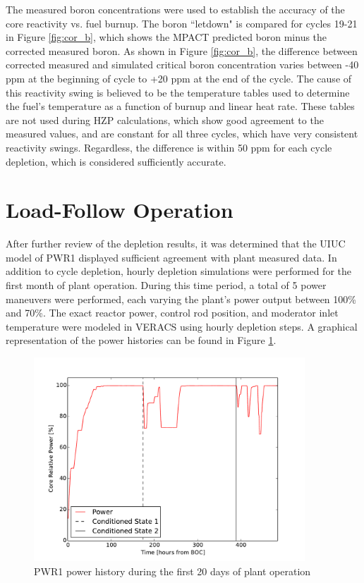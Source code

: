 \documentclass[edeposit,fullpage,11pt]{uiucthesis2009}
\begin{document}
The measured boron concentrations were used to establish the accuracy of the core reactivity vs. fuel burnup. 
The boron ``letdown" is compared for cycles 19-21 in Figure \ref{fig:cor_b}, which shows the MPACT predicted boron minus the corrected measured boron. 
As shown in Figure \ref{fig:cor_b}, the difference between corrected measured and simulated critical boron concentration varies between -40 ppm at the beginning of cycle to +20 ppm at the end of the cycle. 
The cause of this reactivity swing is believed to be the temperature tables used to determine the fuel's temperature as a function of burnup and linear heat rate.
These tables are not used during \gls{HZP} calculations, which show good agreement to the measured values, and are constant for all three cycles, which have very consistent reactivity swings.
Regardless, the difference is within 50 ppm for each cycle depletion, which is considered sufficiently accurate.

\section{Load-Follow Operation}

After further review of the depletion results, it was determined that the \gls{UIUC} model of PWR1 displayed sufficient agreement with plant measured data. 
In addition to cycle depletion, hourly depletion simulations were performed for the first month of plant operation.
During this time period, a total of 5 power maneuvers were performed, each varying the plant's power output between 100\% and 70\%.
The exact reactor power, control rod position, and moderator inlet temperature were modeled in \gls{VERACS} using hourly depletion steps.
A graphical representation of the power histories can be found in Figure \ref{fig:lf_his0}.

\begin{figure}[h]
\begin{center}
\includegraphics[width=4in]{./Figures/M_power_his.pdf} 
\end{center}
\caption{PWR1 power history during the first 20 days of plant operation}
\label{fig:lf_his0}
\end{figure}
\end{document}
